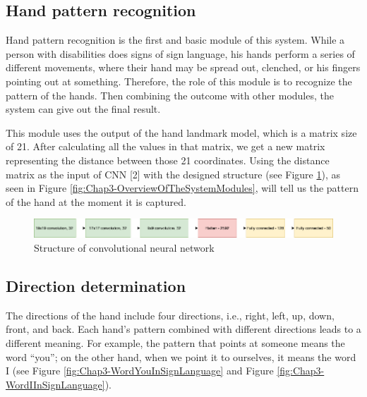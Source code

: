 \subsection{Hand pattern recognition}

Hand pattern recognition is the first and basic module of this system. While a person with disabilities does signs of sign language, his hands perform a series of different movements, where their hand may be spread out, clenched, or his fingers pointing out at something. Therefore, the role of this module is to recognize the pattern of the hands. Then combining the outcome with other modules, the system can give out the final result.

This module uses the output of the hand landmark model, which is a matrix size of 21. After calculating all the values in that matrix, we get a new matrix representing the distance between those 21 coordinates. Using the distance matrix as the input of CNN [2] with the designed structure (see Figure \ref{fig:Chap3-StructureOfConvolutionalNeuralNetwork}), as seen in Figure \ref{fig:Chap3-OverviewOfTheSystemModules}, will tell us the pattern of the hand at the moment it is captured.

\begin{figure}[H]
  \centering
  \includegraphics[width=\textwidth]{img/Chap3/StructureOfConvolutionalNeuralNetwork.png}
  \caption{Structure of convolutional neural network}
  \label{fig:Chap3-StructureOfConvolutionalNeuralNetwork}
\end{figure}

\subsection{Direction determination}

The directions of the hand include four directions, i.e., right, left, up, down, front, and back. Each hand’s pattern combined with different directions leads to a different meaning. For example, the pattern that points at someone means the word “you”; on the other hand, when we point it to ourselves, it means the word I (see Figure \ref{fig:Chap3-WordYouInSignLanguage} and Figure \ref{fig:Chap3-WordIInSignLanguage}).

